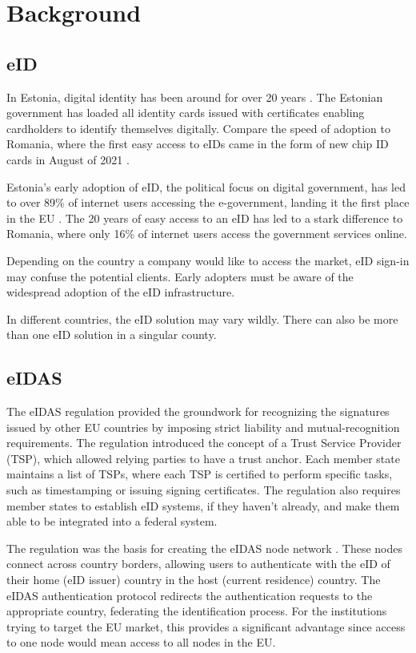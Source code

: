 \section{Background}

\subsection{eID}

In Estonia, digital identity has been around for over 20 years \cite{eelaw-idcard}. The Estonian government has loaded all identity cards issued with certificates enabling cardholders to identify themselves digitally. Compare the speed of adoption to Romania, where the first easy access to eIDs came in the form of new chip ID cards in August of 2021 \cite{romania-adopts-eid}.

Estonia's early adoption of eID, the political focus on digital government, has led to over 89\% of internet users accessing the e-government, landing it the first place in the EU \cite{eu-desi}. The 20 years of easy access to an eID has led to a stark difference to Romania, where only 16\% of internet users access the government services online.

Depending on the country a company would like to access the market, eID sign-in may confuse the potential clients. Early adopters must be aware of the widespread adoption of the eID infrastructure.

In different countries, the eID solution may vary wildly. There can also be more than one eID solution in a singular county.


\subsection{eIDAS}

The eIDAS regulation \cite{eulaw-eidas} provided the groundwork for recognizing the signatures issued by other EU countries by imposing strict liability and mutual-recognition requirements. The regulation introduced the concept of a Trust Service Provider (TSP), which allowed relying parties to have a trust anchor. Each member state maintains a list of TSPs, where each TSP is certified to perform specific tasks, such as timestamping or issuing signing certificates. The regulation also requires member states to establish eID systems, if they haven't already, and make them able to be integrated into a federal system.

The regulation was the basis for creating the eIDAS node network \cite{carretero2018federated}. These nodes connect across country borders, allowing users to authenticate with the eID of their home (eID issuer) country in the host (current residence) country. The eIDAS authentication protocol redirects the authentication requests to the appropriate country, federating the identification process. For the institutions trying to target the EU market, this provides a significant advantage since access to one node would mean access to all nodes in the EU.

